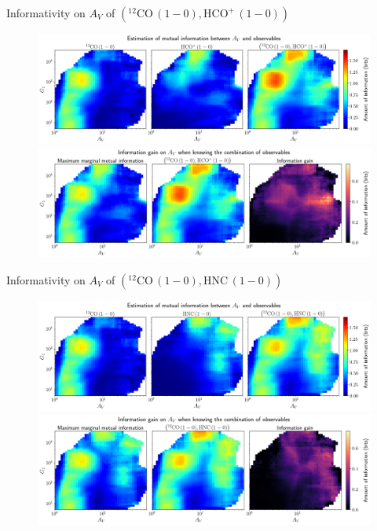 \documentclass{beamer}
\begin{document}
\begin{frame}{Informativity on $A_V$ of $\left(\mathrm{^{12}CO\,(1-0)},\mathrm{HCO^+\,(1-0)}\right)$}
    \begin{figure}
        \centering
        \includegraphics[width=0.95\linewidth]{../mi/av__12co10_hcop10_mi.png}
        \vfill
        \includegraphics[width=0.95\linewidth]{../mi/av__12co10_hcop10_mi_gain.png}
    \end{figure}
\end{frame}

\begin{frame}{Informativity on $A_V$ of $\left(\mathrm{^{12}CO\,(1-0)},\mathrm{HNC\,(1-0)}\right)$}
    \begin{figure}
        \centering
        \includegraphics[width=0.95\linewidth]{../mi/av__12co10_hnc10_mi.png}
        \vfill
        \includegraphics[width=0.95\linewidth]{../mi/av__12co10_hnc10_mi_gain.png}
    \end{figure}
\end{frame}
\end{document}
